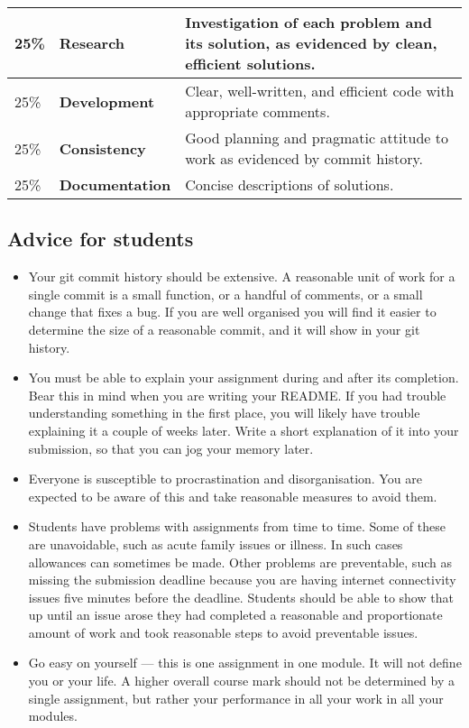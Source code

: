 \documentclass[a4paper, 12pt]{exam}
\begin{document}
  \begin{center}
    \begin{tabular}{llp{8.4cm}}
      \toprule
      25\% & \textbf{Research} & Investigation of each problem and its solution, as evidenced by clean, efficient solutions. \\
      \midrule
      25\% & \textbf{Development} & Clear, well-written, and efficient code with appropriate comments. \\
      \midrule
      25\% & \textbf{Consistency} & Good planning and pragmatic attitude to work as evidenced by commit history. \\
      \midrule
      25\% & \textbf{Documentation} & Concise descriptions of solutions. \\
      \bottomrule
    \end{tabular}
  \end{center}

\subsection*{Advice for students}
  \begin{itemize}
    \item
      Your git commit history should be extensive.
      A reasonable unit of work for a single commit is a small function, or a handful of comments, or a small change that fixes a bug.
      If you are well organised you will find it easier to determine the size of a reasonable commit, and it will show in your git history.
    \item
      You must be able to explain your assignment during and after its completion.
      Bear this in mind when you are writing your README.
      If you had trouble understanding something in the first place, you will likely have trouble explaining it a couple of weeks later.
      Write a short explanation of it into your submission, so that you can jog your memory later.
    \item
      Everyone is susceptible to procrastination and disorganisation.
      You are expected to be aware of this and take reasonable measures to avoid them.
    \item
      Students have problems with assignments from time to time.
      Some of these are unavoidable, such as acute family issues or illness.
      In such cases allowances can sometimes be made.
      Other problems are preventable, such as missing the submission deadline because you are having internet connectivity issues five minutes before the deadline.
      Students should be able to show that up until an issue arose they had completed a reasonable and proportionate amount of work and took reasonable steps to avoid preventable issues.
    \item
      Go easy on yourself --- this is one assignment in one module.
      It will not define you or your life.
      A higher overall course mark should not be determined by a single assignment, but rather your performance in all your work in all your modules.
  \end{itemize}


  
  
\end{document}
